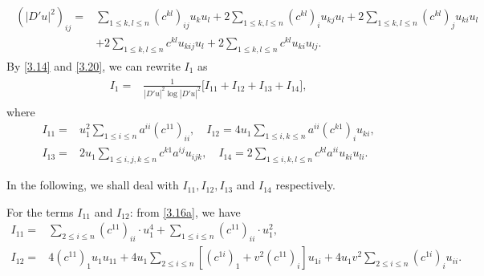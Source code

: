 \documentclass[11pt]{amsart}
\numberwithin{equation}{section}
\begin{document}
\begin{align}\label{3.20}
\begin{split}
(|D'u|^2)_{ij}=&\sum_{1\leq k, l\leq n}(c^{kl})_{ij}u_ku_l+2\sum_{1\leq k, l\leq n}(c^{kl})_iu_{kj}u_l+2\sum_{1\leq k, l\leq n}(c^{kl})_ju_{ki}u_l\\
&+2\sum_{1\leq k, l\leq n}c^{kl}u_{kij}u_l+2\sum_{1\leq k, l\leq n}c^{kl}u_{ki}u_{lj}.
\end{split}
\end{align}
By \eqref{3.14} and \eqref{3.20}, we can rewrite $I_1$ as
\begin{align}\label{3.20a}
\begin{split}
I_1
=&\frac{1}{|D'u|^2\log|D'u|^2}\big[I_{11}+I_{12}+I_{13}+I_{14}\big],
\end{split}
\end{align}
where
\begin{align*}
I_{11}=&u^2_1\sum_{1\leq i\leq n}a^{ii}(c^{11})_{ii} ,\quad
I_{12}=4u_1\sum_{1\leq i,k\leq n}a^{ii}(c^{k1})_{i}u_{ki} ,\\
I_{13}=&2u_1\sum_{1\leq i,j,k\leq n}c^{k1}a^{ij}u_{ijk},\quad
I_{14}=2\sum_{1\leq i,k,l\leq n}c^{kl}a^{ii}u_{ki}u_{li}.
\end{align*}

In the following, we shall deal with $I_{11}, I_{12}, I_{13}$ and $I_{14}$ respectively. \par
For the terms $I_{11}$ and $I_{12}$: from  \eqref{3.16a}, we have
\begin{align}\label{3.21}
I_{11}=&\sum_{2\leq i\leq n}(c^{11})_{ii}\cdot u^4_1+\sum_{1\leq i\leq n}(c^{11})_{ii}\cdot u^2_1,\\
I_{12}
=&4(c^{11})_{1} u_1u_{11}+4 u_1\sum_{2\leq i\leq n}[(c^{1i})_{1}+v^2(c^{11})_{i}]u_{1i}+4u_1v^2\sum_{2\leq i\leq n}(c^{1i})_{i}u_{ii}.\label{3.22}
\end{align}
\end{document}
